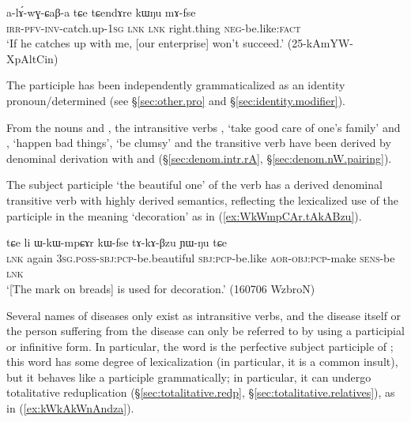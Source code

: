 \begin{exe}
\ex \label{ex:kWNu.mAfse}
 \gll  a-lɤ́-wɣ-ɕaβ-a tɕe tɕendɤre kɯŋu mɤ-fse \\
 \textsc{irr}-\textsc{pfv}-\textsc{inv}-catch.up-\textsc{1sg} \textsc{lnk} \textsc{lnk} right.thing \textsc{neg}-be.like:\textsc{fact} \\ 
\glt `If he catches up with me, [our enterprise] won't succeed.' (25-kAmYW-XpAltCin) 	
\end{exe}

The participle  has been independently grammaticalized as an identity pronoun/determined  (see §\ref{sec:other.pro} and §\ref{sec:identity.modifier}).

From the nouns   and  , the intransitive verbs , `take good care of one's family' and , `happen bad things', `be clumsy' and the transitive verb  have been derived by denominal derivation with  and  (§\ref{sec:denom.intr.rA}, §\ref{sec:denom.nW.pairing}).

The subject participle  `the beautiful one' of the verb  has a derived denominal transitive verb  with highly derived semantics, reflecting the lexicalized use of the participle in the meaning `decoration' as in (\ref{ex:WkWmpCAr.tAkABzu}).

 \begin{exe}
\ex \label{ex:WkWmpCAr.tAkABzu}
 \gll tɕe li ɯ-kɯ-mpɕɤr kɯ-fse tɤ-kɤ-βzu ɲɯ-ŋu tɕe    \\
\textsc{lnk} again \textsc{3sg}.\textsc{poss}-\textsc{sbj}:\textsc{pcp}-be.beautiful \textsc{sbj}:\textsc{pcp}-be.like \textsc{aor}-\textsc{obj}:\textsc{pcp}-make \textsc{sens}-be \textsc{lnk} \\
 \glt `[The mark on breads] is used for decoration.' (160706 WzbroN)
\end{exe}

Several names of diseases only exist as intransitive verbs, and the disease itself or the person suffering from the disease can only be referred to by using a participial or infinitive form. In particular, the word  is the perfective subject participle of ; this word has some degree of lexicalization (in particular, it is a common insult), but it behaves like a participle grammatically; in particular, it can undergo totalitative reduplication (§\ref{sec:totalitative.redp}, §\ref{sec:totalitative.relatives}), as in (\ref{ex:kWkAkWnAndza}).

